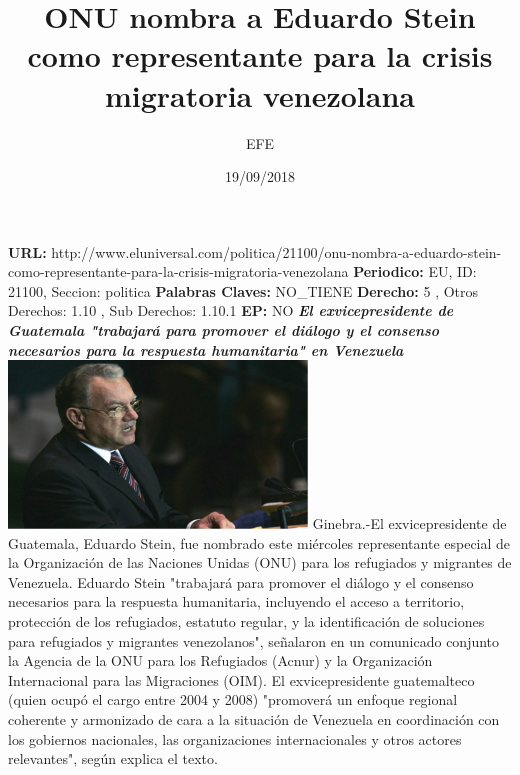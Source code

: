 \documentclass{article}%
\title{\textbf{ONU nombra a Eduardo Stein como representante para la crisis migratoria venezolana}}%
\author{EFE}%
\date{19/09/2018}%
\begin{document}
%
\normalsize%
\maketitle%
\textbf{URL: }%
http://www.eluniversal.com/politica/21100/onu{-}nombra{-}a{-}eduardo{-}stein{-}como{-}representante{-}para{-}la{-}crisis{-}migratoria{-}venezolana\newline%
%
\textbf{Periodico: }%
EU, %
ID: %
21100, %
Seccion: %
politica\newline%
%
\textbf{Palabras Claves: }%
NO\_TIENE\newline%
%
\textbf{Derecho: }%
5%
, Otros Derechos: %
1.10%
, Sub Derechos: %
1.10.1%
\newline%
%
\textbf{EP: }%
NO\newline%
\newline%
%
\textbf{\textit{El exvicepresidente de Guatemala "trabajará para promover el diálogo y el consenso necesarios para la respuesta humanitaria" en Venezuela}}%
\newline%
\newline%
%
\includegraphics[width=300px]{122.jpg}%
\newline%
%
Ginebra.{-}El exvicepresidente de Guatemala, Eduardo Stein, fue nombrado este miércoles representante especial de la Organización de las Naciones Unidas (ONU) para los refugiados y migrantes de Venezuela.%
\newline%
%
Eduardo Stein "trabajará para promover el diálogo y el consenso necesarios para la respuesta humanitaria, incluyendo el acceso a territorio, protección de los refugiados, estatuto regular, y la identificación de soluciones para refugiados y migrantes venezolanos", señalaron en un comunicado conjunto la Agencia de la ONU para los Refugiados (Acnur) y la Organización Internacional para las Migraciones (OIM).%
\newline%
%
El exvicepresidente guatemalteco (quien ocupó el cargo entre 2004 y 2008) "promoverá un enfoque regional coherente y armonizado de cara a la situación de Venezuela en coordinación con los gobiernos nacionales, las organizaciones internacionales y otros actores relevantes", según explica el texto.%
\end{document}
